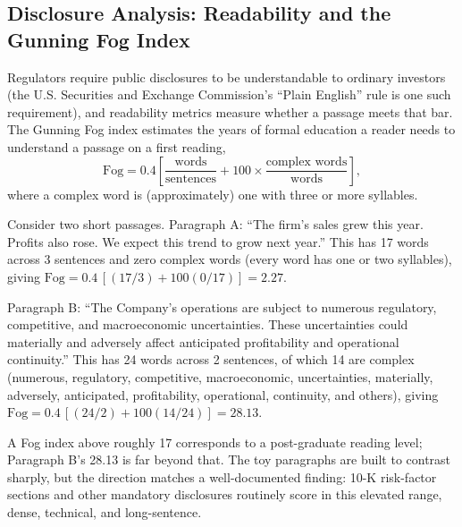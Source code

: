 \documentclass[../ai_in_finance]{subfiles}
\begin{document}
\subsection{Disclosure Analysis: Readability and the Gunning Fog Index}
\label{sec:disclosure-analysis}

Regulators require public disclosures to be understandable to ordinary investors (the U.S. Securities and Exchange Commission's ``Plain English'' rule is one such requirement), and readability metrics measure whether a passage meets that bar. The Gunning Fog index estimates the years of formal education a reader needs to understand a passage on a first reading,
\begin{equation}
\text{Fog} = 0.4 \left[ \frac{\text{words}}{\text{sentences}} + 100 \times \frac{\text{complex words}}{\text{words}} \right],
\label{eq:nlp-fog}
\end{equation}
where a complex word is (approximately) one with three or more syllables.


Consider two short passages. Paragraph A: ``The firm's sales grew this year. Profits also rose. We expect this trend to grow next year.'' This has 17 words across 3 sentences and zero complex words (every word has one or two syllables), giving $\text{Fog} = 0.4\,[(17/3) + 100(0/17)] = 2.27$.

Paragraph B: ``The Company's operations are subject to numerous regulatory, competitive, and macroeconomic uncertainties. These uncertainties could materially and adversely affect anticipated profitability and operational continuity.'' This has 24 words across 2 sentences, of which 14 are complex (numerous, regulatory, competitive, macroeconomic, uncertainties, materially, adversely, anticipated, profitability, operational, continuity, and others), giving $\text{Fog} = 0.4\,[(24/2) + 100(14/24)] = 28.13$.

A Fog index above roughly 17 corresponds to a post-graduate reading level; Paragraph B's 28.13 is far beyond that. The toy paragraphs are built to contrast sharply, but the direction matches a well-documented finding: 10-K risk-factor sections and other mandatory disclosures routinely score in this elevated range, dense, technical, and long-sentence.
\end{document}
